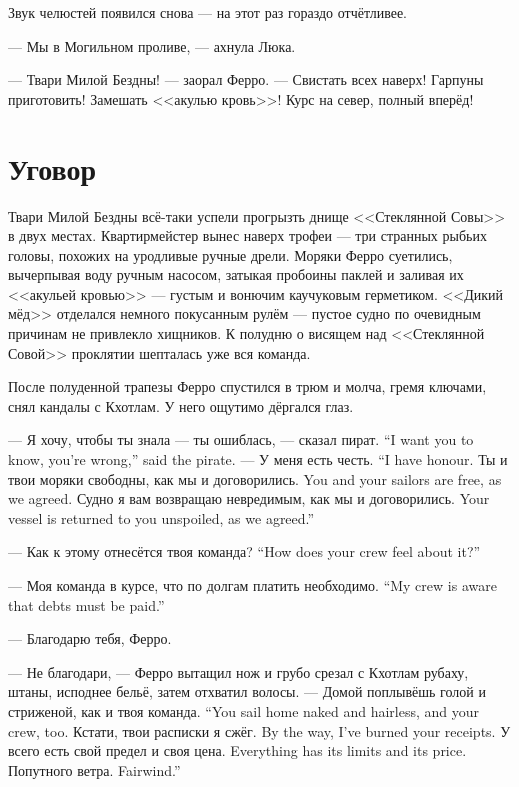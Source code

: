 Звук челюстей появился снова --- на этот раз гораздо отчётливее.

--- Мы в Могильном проливе, --- ахнула Люка.

--- Твари Милой Бездны! --- заорал Ферро.
--- Свистать всех наверх!
Гарпуны приготовить!
Замешать <<акулью кровь>>!
Курс на север, полный вперёд!

\section{Уговор}

Твари Милой Бездны всё-таки успели прогрызть днище <<Стеклянной Совы>> в двух местах.
Квартирмейстер вынес наверх трофеи --- три странных рыбьих головы, похожих на уродливые ручные дрели.
Моряки Ферро суетились, вычерпывая воду ручным насосом, затыкая пробоины паклей и заливая их <<акульей кровью>> --- густым и вонючим каучуковым герметиком.
<<Дикий мёд>> отделался немного покусанным рулём --- пустое судно по очевидным причинам не привлекло хищников.
К полудню о висящем над <<Стеклянной Совой>> проклятии шепталась уже вся команда.

После полуденной трапезы Ферро спустился в трюм и молча, гремя ключами, снял кандалы с Кхотлам.
У него ощутимо дёргался глаз.

{--- Я хочу, чтобы ты знала --- ты ошиблась, --- сказал пират.}
{``I want you to know, you're wrong,'' said the pirate.}
{--- У меня есть честь.}
{``I have honour.}
{Ты и твои моряки свободны, как мы и договорились.}
{You and your sailors are free, as we agreed.}
{Судно я вам возвращаю невредимым, как мы и договорились.}
{Your vessel is returned to you unspoiled, as we agreed.''}

{--- Как к этому отнесётся твоя команда?}
{``How does your crew feel about it?''}

{--- Моя команда в курсе, что по долгам платить необходимо.}
{``My crew is aware that debts must be paid.''}

--- Благодарю тебя, Ферро.

--- Не благодари, --- Ферро вытащил нож и грубо срезал с Кхотлам рубаху, штаны, исподнее бельё, затем отхватил волосы.
{--- Домой поплывёшь голой и стриженой, как и твоя команда.}
{``You sail home naked and hairless, and your crew, too.}
{Кстати, твои расписки я сжёг.}
{By the way, I've burned your receipts.}
{У всего есть свой предел и своя цена.}
{Everything has its limits and its price.}
{Попутного ветра.}
{Fairwind.''}

